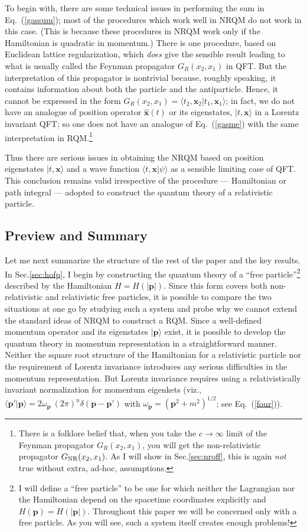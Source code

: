 \documentclass[12pt]{article}
\def\eq#1{{Eq.~(\ref{#1})}}
\def\ket#1{|#1\rangle}                    %
\def\amp#1#2{\langle #1 | #2\rangle}      %
\begin{document}
To begin with, there are some technical issues in performing the sum in \eq{gassum}; most of the procedures which work well in NRQM do not work in this case.
(This is because  these procedures in NRQM work only if the Hamiltonian is quadratic in momentum.)
There is one procedure, based on Euclidean lattice regularization, which \textit{does} give the sensible result leading to what is usually called the Feynman propagator $G_R(x_2,x_1)$ in QFT. But the interpretation of this propagator is  nontrivial because, roughly speaking, it contains information about both the particle and the antiparticle. Hence, it cannot be expressed in the form
$G_R(x_2,x_1)=\amp{t_2,\bm{x}_2}{t_1,\bm{x}_1}$; in fact,
we do not have an analogue of position operator $\hat{\bm{x}}(t)$ or its eigenstates, $\ket{t,\bm{x}}$ in a Lorentz invariant QFT;
so one does not have an analogue of \eq{gasme} with the same interpretation in RQM.\footnote{There is a folklore belief that, when you take the $c\to \infty $ limit of the Feynman propagator $G_R(x_2,x_1)$, you will get the non-relativistic propagator $G_{\rm NR}(x_2, x_1)$. As I will show in Sec.\ref{sec:nroff}, this is again \textit{not} true without extra, ad-hoc, assumptions.} 
 
 Thus there are serious issues in obtaining the NRQM based on position eigenstates $\ket{t,\bm{x}}$ and a wave function $\amp{t,\bm{x}}{\psi}$
 as a sensible limiting case of QFT. This conclusion remains valid irrespective of the procedure --- Hamiltonian or path integral --- adopted to construct the quantum theory of a relativistic particle. 
 
 \subsection{Preview and Summary}\label{sec:presum}
 
  Let me next summarize the structure of the rest of the paper and the key results. In Sec.\ref{sec:hofp}, I begin by constructing the quantum theory of a ``free particle''\footnote{I will define a ``free particle'' to be one for which neither the Lagrangian nor the Hamiltonian depend on the spacetime coordinates explicitly and $H(\bm{p}) = H(|\bm{p}|)$. Throughout this paper we will be concerned only with a free particle. As you will see, such a system itself creates enough problems!} described by the Hamiltonian $ H= H(|\bm{p}|)$. Since this form covers both non-relativistic and relativistic free particles, it is possible to compare the two situations at one go by studying such a system and probe why we cannot extend the standard ideas of NRQM to construct a RQM.   Since a well-defined momentum operator and its eigenstates $\ket{\bm{p}}$ exist, it is possible to develop the quantum theory in momentum representation in a straightforward manner. Neither the square root structure of the Hamiltonian for a relativistic particle nor the requirement of Lorentz invariance introduces any serious difficulties in the momentum representation. But Lorentz invariance  requires using a relativistically invariant normalization for momentum eigenkets (viz., $\amp{\bm{p}'}{\bm{p}} = 2\omega_{\bm{p}}\ (2\pi)^n \delta (\bm{p}- \bm{p}')$ with $\omega_{\bm{p}}=(\bm{p}^2+m^2)^{1/2}$; see \eq{four}).
  
\end{document}
